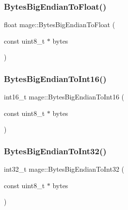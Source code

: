 \hypertarget{namespacemage_ae184a2848f1a490c58f617a9d93b3c88}{}\label{namespacemage_ae184a2848f1a490c58f617a9d93b3c88} 
\subsubsection{\texorpdfstring{Bytes\+Big\+Endian\+To\+Float()}{BytesBigEndianToFloat()}}
{\footnotesize\ttfamily float mage\+::\+Bytes\+Big\+Endian\+To\+Float (\begin{DoxyParamCaption}\item[{const uint8\+\_\+t $\ast$}]{bytes }\end{DoxyParamCaption})}

\hypertarget{namespacemage_a67572c654c8ede11eed23c9c556e439f}{}\label{namespacemage_a67572c654c8ede11eed23c9c556e439f} 
\subsubsection{\texorpdfstring{Bytes\+Big\+Endian\+To\+Int16()}{BytesBigEndianToInt16()}}
{\footnotesize\ttfamily int16\+\_\+t mage\+::\+Bytes\+Big\+Endian\+To\+Int16 (\begin{DoxyParamCaption}\item[{const uint8\+\_\+t $\ast$}]{bytes }\end{DoxyParamCaption})}

\hypertarget{namespacemage_ae98f64655a7d791c6c6efba16ce6b8e8}{}\label{namespacemage_ae98f64655a7d791c6c6efba16ce6b8e8} 
\subsubsection{\texorpdfstring{Bytes\+Big\+Endian\+To\+Int32()}{BytesBigEndianToInt32()}}
{\footnotesize\ttfamily int32\+\_\+t mage\+::\+Bytes\+Big\+Endian\+To\+Int32 (\begin{DoxyParamCaption}\item[{const uint8\+\_\+t $\ast$}]{bytes }\end{DoxyParamCaption})}

\hypertarget{namespacemage_a52f6dec57a9c644e912a88f8cfabe199}{}\label{namespacemage_a52f6dec57a9c644e912a88f8cfabe199} 
